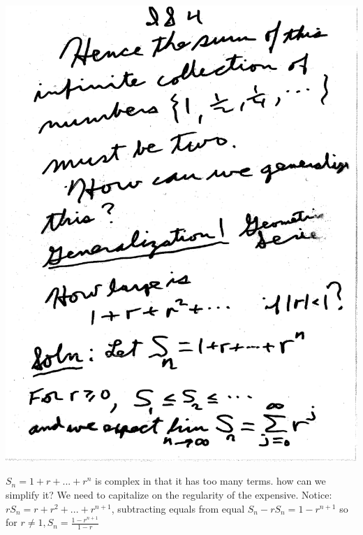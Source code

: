 \documentclass[10pt,a4paper]{article}
\begin{document}
{{\includegraphics[scale=.5]{Pages/IS_4}

\newpage

$S_{n}=1+r+...+r^{n}$ is complex in that it has too many terms. how can we simplify it? We need to capitalize on the regularity of the expensive. 
Notice: $rS_{n}=r+r^{2}+...+r^{n+1}$, subtracting equals from equal $S_{n}-rS_{n}=1-r^{n+1}$ so for $r\neq 1, S_{n}=\frac{1-r^{n+1}}{1-r}$

}}
\end{document}
